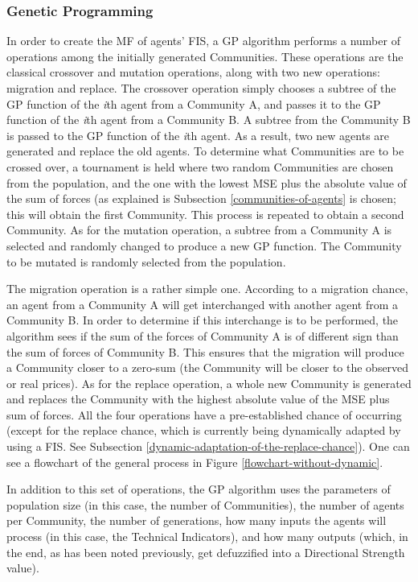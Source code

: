 \documentclass[12pt,journal,draftcls,onecolumn]{IEEEtran}
\begin{document}
\subsubsection{Genetic Programming}

In order to create the MF of agents' FIS, a GP algorithm performs a number of operations among the initially generated Communities. These operations are the classical crossover and mutation operations, along with two new operations: migration and replace. The crossover operation simply chooses a subtree of the GP function of the \textit{i}th agent from a Community A, and passes it to the GP function of the \textit{i}th agent from a Community B. A subtree from the Community B is passed to the GP function of the \textit{i}th agent. As a result, two new agents are generated and replace the old agents. To determine what Communities are to be crossed over, a tournament is held where two random Communities are chosen from the population, and the one with the lowest MSE plus the absolute value of the sum of forces (as explained is Subsection \ref{communities-of-agents} is chosen; this will obtain the first Community. This process is repeated to obtain a second Community. As for the mutation operation, a subtree from a Community A is selected and randomly changed to produce a new GP function. The Community to be mutated is randomly selected from the population.

The migration operation is a rather simple one. According to a migration chance, an agent from a Community A will get interchanged with another agent from a Community B. In order to determine if this interchange is to be performed, the algorithm sees if the sum of the forces of Community A is of different sign than the sum of forces of Community B. This ensures that the migration will produce a Community closer to a zero-sum (the Community will be closer to the observed or real prices). As for the replace operation, a whole new Community is generated and replaces the Community with the highest absolute value of the MSE plus sum of forces. All the four operations have a pre-established chance of occurring (except for the replace chance, which is currently being dynamically adapted by using a FIS. See Subsection \ref{dynamic-adaptation-of-the-replace-chance}). One can see a flowchart of the general process in Figure \ref{flowchart-without-dynamic}.

In addition to this set of operations, the GP algorithm uses the parameters of population size (in this case, the number of Communities), the number of agents per Community, the number of generations, how many inputs the agents will process (in this case, the Technical Indicators), and how many outputs (which, in the end, as has been noted previously, get defuzzified into a Directional Strength value).
\end{document}

